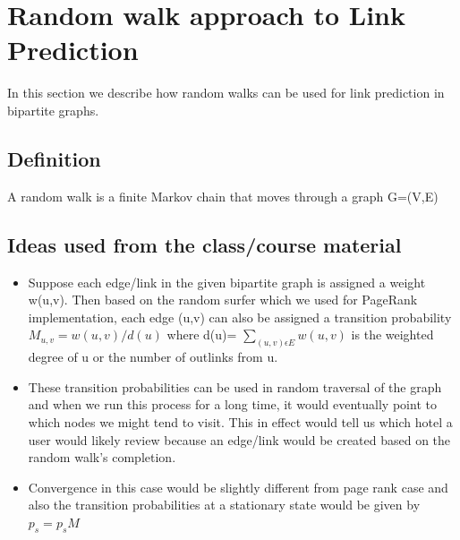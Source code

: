 \documentclass[letterpaper,twocolumn,11pt]{article}
\begin{document}
\section{Random walk approach to Link Prediction}

In this section we describe how random walks can be used for link prediction in bipartite graphs.

\subsection{Definition}
A random walk is a finite Markov chain that moves through a graph G=(V,E)

\subsection{Ideas used from the class/course material}
\begin{itemize}

\item Suppose each edge/link in the given bipartite graph is assigned a weight w(u,v). Then based on the random surfer which we used for PageRank implementation, each edge (u,v) can also be assigned a transition probability $M_{u,v} =w(u,v) / d(u)$ where d(u)= $\sum_{(u,v) \epsilon E} w(u,v)$ is the weighted degree  of u or the number of outlinks from u.

\item These transition probabilities can be used  in random traversal of the graph  and when we run this process for a long time, it would eventually point to which nodes we might tend to visit. This in effect would tell us which hotel a user would likely review because an edge/link would be created based on the random walk's completion.

\item Convergence in this case would be slightly different from page rank case and also the transition probabilities at a stationary state would be given by $p_s= p_s M$
 \end{itemize}
\end{document}
